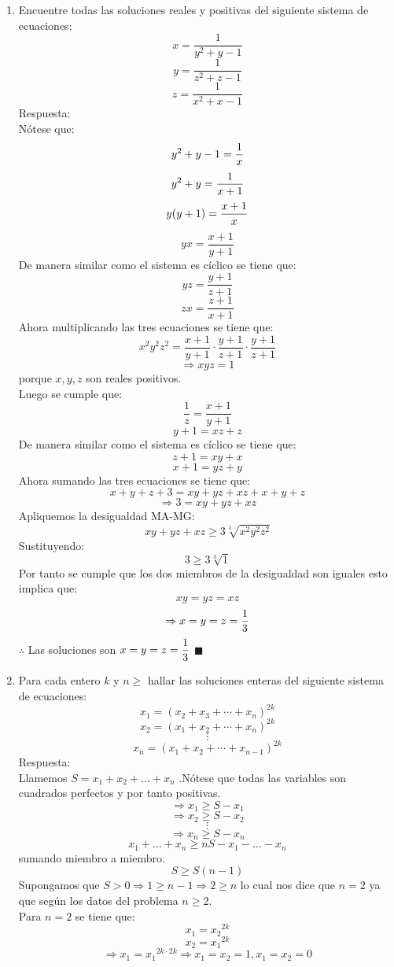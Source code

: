 \documentclass{book}
\begin{document}
\begin{enumerate}
        \item Encuentre todas las soluciones reales y positivas del siguiente sistema de ecuaciones:
        $$x=\frac{1}{y^2+y-1}$$
        $$y=\frac{1}{z^2+z-1}$$
        $$z=\frac{1}{x^2+x-1}$$
        Respuesta:\\
        Nótese que:
        $$y^2+y-1={1\over x}$$
        $$y^2+y={1\over x+1}$$
        $$y(y+1)={x+1\over x}$$
        $$yx=\frac{x+1}{y+1}$$
        De manera similar como el sistema es cíclico se tiene que:
        $$yz=\frac{y+1}{z+1}$$
        $$zx=\frac{z+1}{x+1}$$
        Ahora multiplicando las tres ecuaciones se tiene que:
        $$x^2 y^2 z^2=\frac{x+1}{y+1}\cdot\frac{y+1}{z+1}\cdot\frac{y+1}{z+1}$$
        $$\Rightarrow xyz=1$$
        porque $x,y,z$ son reales positivos.\\
        Luego se cumple que:
        $$\frac{1}{z}=\frac{x+1}{y+1}$$
        $$y+1=xz+z$$
        De manera similar como el sistema es cíclico se tiene que:
        $$z+1=xy+x$$
        $$x+1=yz+y$$
        Ahora sumando las tres ecuaciones se tiene que:
        $$x+y+z+3=xy+yz+xz+x+y+z$$
        $$\Rightarrow 3=xy+yz+xz$$
        Apliquemos la desigualdad MA-MG:
        $$xy+yz+xz\geq 3\sqrt[3]{x^2 y^2 z^2}$$
        Sustituyendo:
        $$3\geq 3\sqrt[3]{1}$$
        Por tanto se cumple que los dos miembros de la desigualdad son iguales esto implica que:
        $$xy=yz=xz$$
        $$\Rightarrow x=y=z={1\over 3}$$
        $\therefore$ Las soluciones son $\displaystyle{x=y=z={1\over 3}}$ $\blacksquare$\\
        \item Para cada entero $k$ y $n\geq$  hallar las soluciones enteras del siguiente sistema de ecuaciones:
        $$x_1={(x_2+x_3+\cdots+x_n)}^{2k}$$
        $$x_2={(x_1+x_2+\cdots+x_n)}^{2k}$$
        $$\vdots$$
        $$x_n={(x_1+x_2+\cdots+x_{n-1})}^{2k}$$
        Respuesta:\\
        Llamemos  $S=x_1+x_2+\ldots+x_n$ .Nótese que todas las variables son cuadrados perfectos y por tanto positivas.
        $$\Rightarrow x_1\geq S-x_1$$
        $$\Rightarrow x_2\geq S-x_2$$
        $$\vdots$$
        $$\Rightarrow x_n\geq S-x_n$$
        $$x_1+\ldots+x_n\geq nS-x_1-\ldots-x_n$$ sumando miembro a miembro.
        $$S\geq S(n-1)$$
        Supongamos que  $S> 0 \Rightarrow  1\geq n-1 \Rightarrow  2\geq n $ lo cual nos dice que $n=2$ ya que según los datos del problema $n\geq 2$.\\
        Para $n=2$ se tiene que:
        $$x_1={x_2}^{2k}$$
        $$x_2={x_1}^{2k}$$
        $$\Rightarrow x_1={x_1}^{2k\cdot 2k}\Rightarrow  x_1=x_2=1,x_1=x_2=0$$

\end{enumerate}
\end{document}

